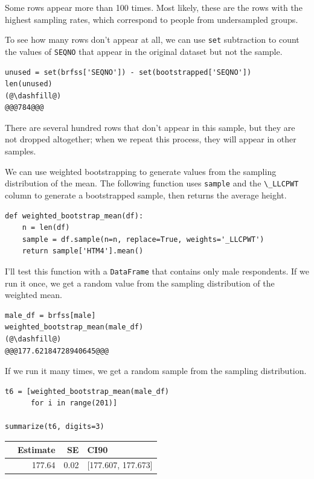 Some rows appear more than 100 times. Most likely, these are the rows
with the highest sampling rates, which correspond to people from
undersampled groups.

To see how many rows don't appear at all, we can use
\passthrough{\lstinline!set!} subtraction to count the values of
\passthrough{\lstinline!SEQNO!} that appear in the original dataset but
not the sample.

\begin{lstlisting}[]
unused = set(brfss['SEQNO']) - set(bootstrapped['SEQNO'])
len(unused)
(@\dashfill@)
@@@784@@@
\end{lstlisting}

There are several hundred rows that don't appear in this sample, but
they are not dropped altogether; when we repeat this process, they will
appear in other samples.

We can use weighted bootstrapping to generate values from the sampling
distribution of the mean. The following function uses
\passthrough{\lstinline!sample!} and the
\passthrough{\lstinline!\_LLCPWT!} column to generate a bootstrapped
sample, then returns the average height.

\begin{lstlisting}[]
def weighted_bootstrap_mean(df):
    n = len(df)
    sample = df.sample(n=n, replace=True, weights='_LLCPWT')
    return sample['HTM4'].mean()
\end{lstlisting}

I'll test this function with a \passthrough{\lstinline!DataFrame!} that
contains only male respondents. If we run it once, we get a random value
from the sampling distribution of the weighted mean.

\begin{lstlisting}[]
male_df = brfss[male]
weighted_bootstrap_mean(male_df)
(@\dashfill@)
@@@177.62184728940645@@@
\end{lstlisting}

If we run it many times, we get a random sample from the sampling
distribution.

\begin{lstlisting}[]
t6 = [weighted_bootstrap_mean(male_df) 
      for i in range(201)]

summarize(t6, digits=3)
\end{lstlisting}

\begin{tabular}{lrrl}
\midrule
{} &  Estimate &    SE &                CI90 \\
\midrule
{} &    177.64 &  0.02 &  [177.607, 177.673] \\
\midrule
\end{tabular}

